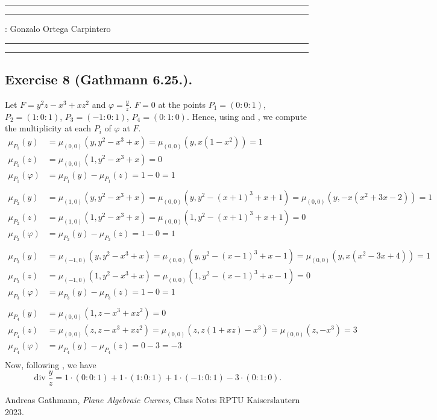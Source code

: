 \documentclass[11pt,a4paper]{article}
\begin{document}
\hrule\hrule
\vspace{1mm}


\vspace{1mm}

 : Gonzalo Ortega Carpintero
\vspace{2mm}

\hrule\hrule

\subsection*{Exercise 8 (Gathmann 6.25.).}
Let $ F = y^2 z - x^3 + xz^2 $ and $ \varphi = \frac{y}{z} $. $ F = 0$ at the points $ P_1 = (0:0:1) $, $ P_2 = (1:0:1) $, $ P_3 = (-1:0:1) $, $ P_4 = (0:1:0) $. Hence, using \cite[Construction 6.17]{gath} and \cite[Algorithm 2.12]{gath}, we compute the multiplicity at each $ P_i $ of $ \varphi $ at $ F $.
\begin{align*}
  \mu_{P_1}(y) &= \mu_{(0,0)}(y, y^2-x^3+x) = \mu_{(0,0)}(y, x(1-x^2)) = 1 \\
  \mu_{P_1}(z) &= \mu_{(0,0)}(1, y^2-x^3+x) = 0 \\
  \mu_{P_1}(\varphi) &= \mu_{P_1}(y) - \mu_{P_1}(z) = 1 - 0 = 1 \\
  \\
  \mu_{P_2}(y) &= \mu_{(1,0)}(y, y^2-x^3+x) = \mu_{(0,0)}(y, y^2-(x+1)^3+x+1) = \mu_{(0,0)}(y, -x(x^2+3x-2)) = 1 \\
  \mu_{P_2}(z) &= \mu_{(1,0)}(1, y^2-x^3+x) = \mu_{(0,0)}(1, y^2-(x+1)^3+x+1) = 0 \\
  \mu_{P_2}(\varphi) &= \mu_{P_2}(y) - \mu_{P_2}(z) = 1 - 0 = 1 \\
  \\
  \mu_{P_3}(y) &= \mu_{(-1,0)}(y, y^2-x^3+x) = \mu_{(0,0)}(y, y^2-(x-1)^3+x-1) = \mu_{(0,0)}(y, x(x^2-3x+4)) = 1 \\
  \mu_{P_3}(z) &= \mu_{(-1,0)}(1, y^2-x^3+x) = \mu_{(0,0)}(1, y^2-(x-1)^3+x-1) = 0 \\
  \mu_{P_3}(\varphi) &= \mu_{P_3}(y) - \mu_{P_3}(z) = 1 - 0 = 1 \\
  \\
  \mu_{P_4}(y) &= \mu_{(0,0)}(1, z-x^3+xz^2) = 0 \\
  \mu_{P_4}(z) &= \mu_{(0,0)}(z, z-x^3+xz^2) = \mu_{(0,0)}(z, z(1+xz)-x^3) = \mu_{(0,0)}(z, -x^3) = 3\\
  \mu_{P_4}(\varphi) &= \mu_{P_4}(y) - \mu_{P_4}(z) = 0 - 3 = -3 \\
\end{align*}
Now, following \cite[Construction 6.23]{gath}, we have
$$
  \operatorname{div}\frac{y}{z} = 1 \cdot (0:0:1) + 1 \cdot (1:0:1) + 1 \cdot (-1:0:1) - 3 \cdot (0:1:0).
$$

\begin{thebibliography}{9}

  Andreas Gathmann,
  \textit{Plane Algebraic Curves},
  Class Notes RPTU Kaiserslautern 2023.
  
\end{thebibliography}
\end{document}
